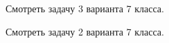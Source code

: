 






\noindent Смотреть задачу 3 варианта 7 класса.




\noindent Смотреть задачу 2 варианта 7 класса.
